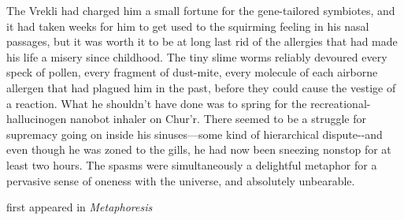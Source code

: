 
The Vrekli had charged him a small fortune for the gene-tailored
symbiotes, and it had taken weeks for him to get used to the squirming
feeling in his nasal passages, but it was worth it to be at long last
rid of the allergies that had made his life a misery since childhood.
The tiny slime worms reliably devoured every speck of pollen, every
fragment of dust-mite, every molecule of each airborne allergen that had
plagued him in the past, before they could cause the vestige of a
reaction. What he shouldn't have done was to spring for the
recreational-hallucinogen nanobot inhaler on Chur'r. There seemed to be
a struggle for supremacy going on inside his sinuses---some kind of
hierarchical dispute-\/-and even though he was zoned to the gills, he
had now been sneezing nonstop for at least two hours. The spasms were
simultaneously a delightful metaphor for a pervasive sense of oneness
with the universe, and absolutely unbearable.

first appeared in \emph{Metaphoresis}
